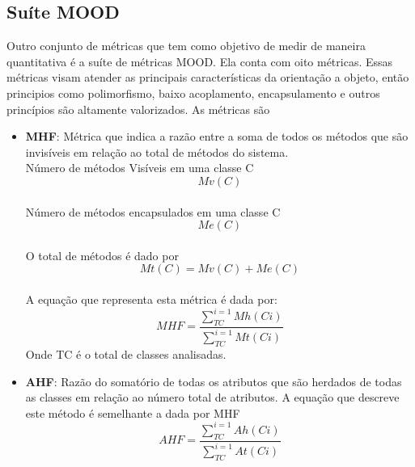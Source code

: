 \subsection{Suíte MOOD}
Outro conjunto de métricas que tem como objetivo de medir de maneira quantitativa é a suíte de métricas MOOD. Ela conta com oito métricas. Essas métricas visam atender as principais características da orientação a objeto, então principios como polimorfismo, baixo acoplamento, encapsulamento e outros princípios são altamente valorizados. As métricas são \cite{paulo_meirelles} \cite{moreira_avaliacao_2015}
\begin{itemize}
\item \textbf{MHF}: Métrica que indica a razão entre a soma de todos os métodos que são invisíveis em relação ao total de métodos do sistema.
\\Número de métodos Visíveis em uma classe C
\begin{equation}
Mv(C)
\end{equation}
\\Número de métodos encapsulados em uma classe C
\begin{equation}
Me(C)
\end{equation}
\\O total de métodos é dado por
\begin{equation}
Mt(C) = Mv(C)+Me(C)
\end{equation}
\\A equação que representa esta métrica é dada por:
\begin{equation}
MHF =\frac{\sum_{TC}^{i=1}Mh(Ci)}{\sum_{TC}^{i=1}Mt(Ci)}
\end{equation}
Onde TC é o total de classes analisadas.

\item \textbf{AHF}: Razão do somatório de todas os atributos que são herdados de todas as classes em relação ao número total de atributos. A equação que descreve este método é semelhante a dada por MHF
\begin{equation}
AHF =\frac{\sum_{TC}^{i=1}Ah(Ci)}{\sum_{TC}^{i=1}At(Ci)}
\end{equation}


\end{itemize}
